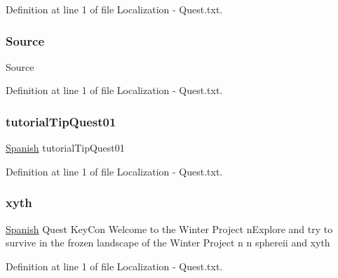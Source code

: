 Definition at line 1 of file Localization -\/ Quest.\+txt.

\mbox{\label{_sphere_i_i_01_winter_01_project_2_config_2_localization_01-_01_quest_8txt_a176e1eca2d1e3d1c6a064340bc6a351e}} 
\subsubsection{\texorpdfstring{Source}{Source}}
{\footnotesize\ttfamily Source}



Definition at line 1 of file Localization -\/ Quest.\+txt.

\mbox{\label{_sphere_i_i_01_winter_01_project_2_config_2_localization_01-_01_quest_8txt_a8ef521616f181ae4be45cc78eb204b15}} 
\subsubsection{\texorpdfstring{tutorialTipQuest01}{tutorialTipQuest01}}
{\footnotesize\ttfamily \mbox{\hyperlink{_sphere_i_i_01_winter_01_project_2_config_2_localization_8txt_a1a2fba2f516cad50ef94b146902a8336}{Spanish}} tutorial\+Tip\+Quest01}



Definition at line 1 of file Localization -\/ Quest.\+txt.

\mbox{\label{_sphere_i_i_01_winter_01_project_2_config_2_localization_01-_01_quest_8txt_a644486df9bf1fa5afa182c0364ad184a}} 
\subsubsection{\texorpdfstring{xyth}{xyth}}
{\footnotesize\ttfamily \mbox{\hyperlink{_sphere_i_i_01_winter_01_project_2_config_2_localization_8txt_a1a2fba2f516cad50ef94b146902a8336}{Spanish}} Quest Key\+Con Welcome to the Winter Project n\+Explore and try to survive in the frozen landscape of the Winter Project n n sphereii and xyth}



Definition at line 1 of file Localization -\/ Quest.\+txt.

